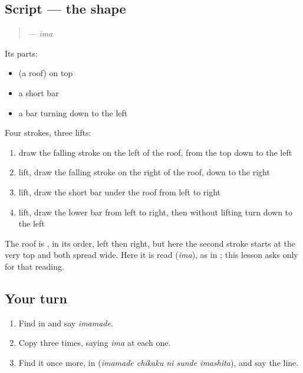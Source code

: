 \subsection*{Script — the shape}
\begin{quote}
\textbf{} — \emph{ima}
\end{quote}

Its parts:

\begin{itemize}
\raggedright
  \item {} (a roof) on top
  \item a short bar
  \item a bar turning down to the left
\end{itemize}

Four strokes, three lifts:

\begin{enumerate}
\raggedright
  \item draw the falling stroke on the left of the roof, from the top down to the left
  \item lift, draw the falling stroke on the right of the roof, down to the right
  \item lift, draw the short bar under the roof from left to right
  \item lift, draw the lower bar from left to right, then without lifting turn down to the left
\end{enumerate}

The roof is \textbf{}, in its order, left then right, but here the second stroke starts at the very top and both spread wide. Here it is read \textbf{} (\emph{ima}), as in \textbf{}; this lesson asks only for that reading.

\subsection*{Your turn}
\begin{enumerate}
\raggedright
  \item Find \textbf{} in \textbf{} and say \emph{imamade}.
  \item Copy \textbf{} three times, saying \emph{ima} at each one.
  \item Find it once more, in \textbf{  } (\emph{imamade chikaku ni sunde imashita}), and say the line.
\end{enumerate}

